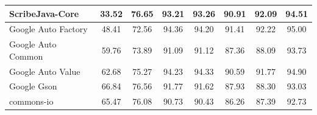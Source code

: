 \documentclass[conference,draftclsnofoot,onecolumn]{IEEEtran}
\begin{document}
\begin{table}[ht]
\begin{tabular}{|l|c|c|c|c|c|c|c|}
ScribeJava-Core               & 33.52                                                 & 76.65                                                   & 93.21                                                    & 93.26                                                  & 90.91                                                   & 92.09                                                   & 94.51                                                      \\ \hline
Google Auto Factory           & 48.41                                                 & 72.56                                                   & 94.36                                                    & 94.20                                                  & 91.41                                                   & 92.22                                                   & 95.00                                                      \\ \hline
Google Auto Common            & 59.76                                                 & 73.89                                                   & 91.09                                                    & 91.12                                                  & 87.36                                                   & 88.09                                                   & 93.73                                                      \\ \hline
Google Auto Value             & 62.68                                                 & 75.27                                                   & 94.23                                                    & 94.33                                                  & 90.59                                                   & 91.77                                                   & 94.90                                                      \\ \hline
Google Gson                   & 66.84                                                 & 76.56                                                   & 91.77                                                    & 91.62                                                  & 87.93                                                   & 88.30                                                   & 93.03                                                      \\ \hline
commons-io                    & 65.47                                                 & 76.08                                                   & 90.73                                                    & 90.43                                                  & 86.26                                                   & 87.39                                                   & 92.73                                                      \\ \hline

\end{tabular}
\end{table}
\end{document}
